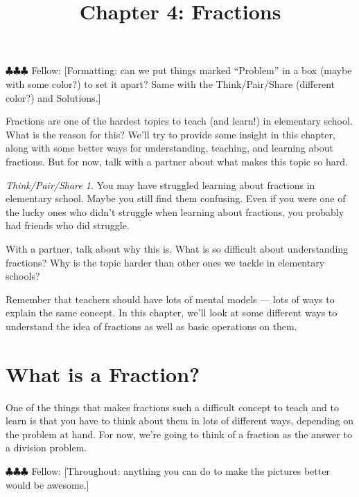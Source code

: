 \documentclass[10pt, reqno]{amsart}
\title{Chapter 4: Fractions}
\theoremstyle{remark}
\newtheorem*{thinkpair*}{Think/Pair/Share}
\theoremstyle{definition}
\numberwithin{equation}{section}  %
\newcommand{\fellow}[1]{{\color{magenta} \sf $\clubsuit\clubsuit\clubsuit$ Fellow: [#1]}}
\begin{document}
\maketitle

\fellow{Formatting: can we put things marked ``Problem'' in a box (maybe with some color?) to set it apart?  Same with the Think/Pair/Share (different color?) and Solutions.}

Fractions are one of the hardest topics to teach (and learn!) in elementary school.  What is the reason for this?  We'll try to provide some insight in this chapter, along with some better ways for understanding, teaching, and learning about fractions.  But for now, talk with a partner about what makes this topic so hard.


\begin{thinkpair*}
You may have struggled learning about fractions in elementary school.  Maybe you still find them confusing.  Even if you were one of the lucky ones who didn't struggle when learning about fractions, you probably had friends who did struggle.

With a partner, talk about why this is.  What is so difficult about understanding fractions?  Why is the topic harder than other ones we tackle in elementary schools?
\end{thinkpair*}

Remember that teachers should have lots of mental models --- lots of ways to explain the same concept.  In this chapter, we'll look at some different ways to understand the idea of fractions as well as basic operations on them. 



\section{What is a Fraction?}
One of the things that makes fractions such a difficult concept to teach and to learn is that you have to think about them in lots of different ways, depending on the problem at hand.
For now, we're going to think of a fraction as the answer to a division problem.  

\fellow{Throughout: anything you can do to make the pictures better would be awesome.}
\end{document}
